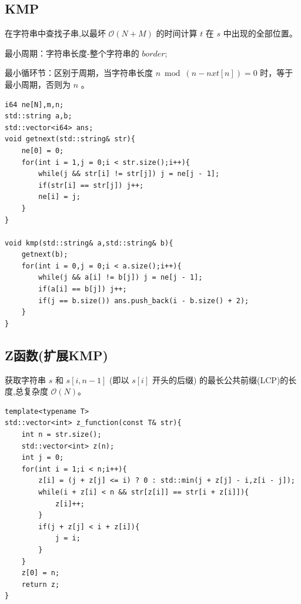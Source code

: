 \subsection{KMP}
在字符串中查找子串,以最坏 $\mathcal O(N+M)$ 的时间计算 $t$ 在 $s$ 中出现的全部位置。

最小周期：字符串长度-整个字符串的 $border$;

最小循环节：区别于周期，当字符串长度 $n \bmod (n - nxt[n]) = 0$ 时，等于最小周期，否则为 $n$ 。
\begin{lstlisting}[caption={}]
i64 ne[N],m,n;
std::string a,b;
std::vector<i64> ans;
void getnext(std::string& str){
	ne[0] = 0;
	for(int i = 1,j = 0;i < str.size();i++){
		while(j && str[i] != str[j]) j = ne[j - 1];
		if(str[i] == str[j]) j++;
		ne[i] = j;
	}
}

void kmp(std::string& a,std::string& b){
	getnext(b);
	for(int i = 0,j = 0;i < a.size();i++){
		while(j && a[i] != b[j]) j = ne[j - 1];
		if(a[i] == b[j]) j++;
		if(j == b.size()) ans.push_back(i - b.size() + 2);
	}
}
\end{lstlisting}

\subsection{Z函数(扩展KMP)}
获取字符串 $s$ 和 $s[i,n-1]$ (即以 $s[i]$ 开头的后缀)
的最长公共前缀(LCP)的长度,总复杂度 $\mathcal O(N)$。
\begin{lstlisting}[caption={}]
template<typename T>
std::vector<int> z_function(const T& str){
    int n = str.size();
    std::vector<int> z(n);
    int j = 0;
    for(int i = 1;i < n;i++){
        z[i] = (j + z[j] <= i) ? 0 : std::min(j + z[j] - i,z[i - j]);
        while(i + z[i] < n && str[z[i]] == str[i + z[i]]){
            z[i]++;
        }
        if(j + z[j] < i + z[i]){
            j = i;
        }
    }
    z[0] = n;
    return z;
}
\end{lstlisting}

